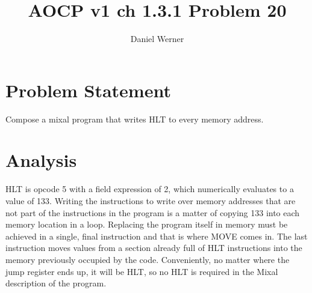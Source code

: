 \documentclass{article}
\title{AOCP v1 ch 1.3.1 Problem 20}
\author{Daniel Werner}
\begin{document}
\maketitle

\section*{
    Problem Statement
}

Compose a mixal program that writes HLT to every memory address.

\section*{
    Analysis
}

HLT is opcode 5 with a field expression of 2, which numerically evaluates to a value of 133.
Writing the instructions to write over memory addresses that are not part of the instructions
in the program is a matter of copying 133 into each memory location in a loop.  Replacing the
program itself in memory must be achieved in a single, final instruction and that is where
MOVE comes in.  The last instruction moves values from a section already full of HLT
instructions into the memory previously occupied by the code.  Conveniently, no matter where
the jump register ends up, it will be HLT, so no HLT is required in the Mixal description of
the program.
\end{document}
